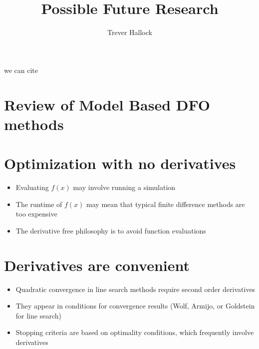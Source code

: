 \documentclass{article} %
\title{Possible Future Research}
\author{Trever Hallock}
\begin{document}
%
\algnewcommand{\Goto}{\algorithmicgoto\xspace}%
\algnewcommand{\Label}{\State\unskip}

\maketitle

we can cite
\cite{DUMMY:1}
\cite{DUMMY:Biegler}
\cite{DUMMY:Fletcher}
\cite{DUMMY:Brekelman}
\cite{DUMMY:CombineTrustAndLine}
\cite{DUMMY:linesearch_global}
\cite{DUMMY:linesearch_local}
\cite{DUMMY:intro_book}
\cite{DUMMY:trust_funnel_dfo}
\cite{DUMMY:original_filter}
\cite{DUMMY:sqp_filter}










\section{Review of Model Based DFO methods}


\section{Optimization with no derivatives}
\begin{itemize}
\item Evaluating $f(x)$ may involve running a simulation
\item The runtime of $f(x)$ may mean that typical finite difference methods are too expensive
\item The derivative free philosophy is to avoid function evaluations
\end{itemize}


\section{Derivatives are convenient}

\begin{itemize}
\item Quadratic convergence in line search methods require second order derivatives
\item They appear in conditions for convergence results (Wolf, Armijo, or Goldstein for line search)
\item Stopping criteria are based on optimality conditions, which frequently involve derivatives
\end{itemize}
\end{document}
